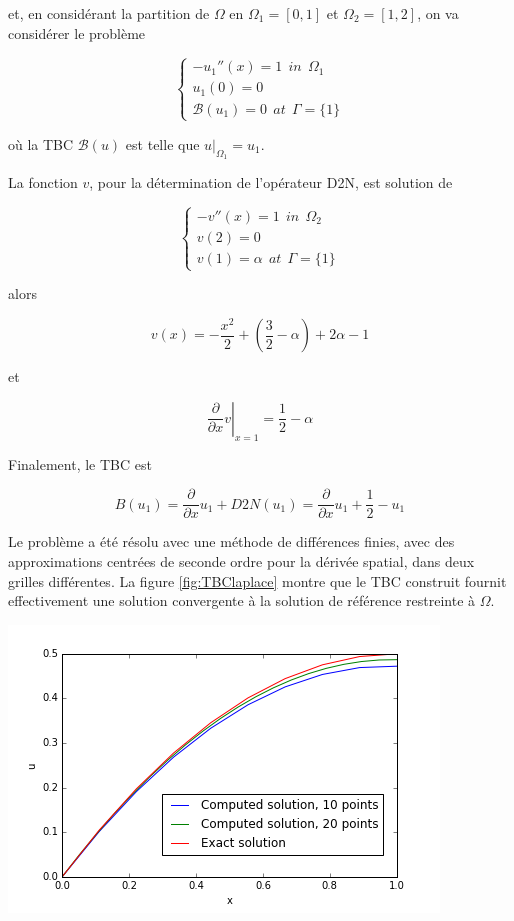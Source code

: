 \noindent et, en considérant la partition de $\Omega$ en $\Omega_1 = [0,1]$ et $\Omega_2 = [1,2]$, on va considérer le problème

\begin{equation*}
\begin{cases}
-u_1''(x) = 1 \ \ in \ \ \Omega_1\\
u_1(0) = 0 \\
\mathcal{B}(u_1) = 0 \ \ at \ \ \Gamma=\{1\}
\end{cases}
\end{equation*}

\noindent où la TBC $\mathcal{B}(u)$ est telle que $u|_{\Omega_1} = u_1$.

\indent La fonction $v$, pour la détermination de l'opérateur D2N, est solution de

\begin{equation*}
\begin{cases}
-v''(x) = 1 \ \ in \ \ \Omega_2\\
v(2) = 0 \\
v(1) = \alpha \ \ at \ \ \Gamma=\{1\}
\end{cases}
\end{equation*}

\noindent alors

$$v(x) = -\frac{x^2}{2} + \left(\frac{3}{2} - \alpha \right) + 2\alpha -1$$

\noindent et

$$\left. \frac{\partial}{\partial x}v \right\rvert_{x=1} = \frac{1}{2} - \alpha$$

\indent Finalement, le TBC est

$$B(u_1) = \frac{\partial}{\partial x}u_1 + D2N(u_1) = \frac{\partial}{\partial x}u_1+ \frac{1}{2} - u_1$$

\indent Le problème a été résolu avec une méthode de différences finies, avec des approximations centrées de seconde ordre pour la dérivée spatial, dans deux grilles différentes. La figure \ref{fig:TBClaplace} montre que le TBC construit fournit effectivement une solution convergente à la solution de référence restreinte à $\Omega$.

\begin{center}
	\includegraphics[scale=.5]{figures/TBClaplace.png}
\end{center}

